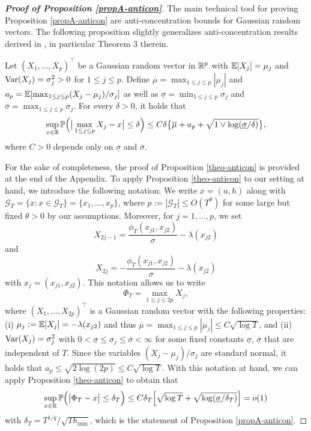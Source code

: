 \documentclass[a4paper,12pt]{article}
\numberwithin{equation}{section}
\begin{document}
\begin{proof}[\textnormal{\textbf{Proof of Proposition \ref{propA-anticon}}}] 
The main technical tool for proving Proposition \ref{propA-anticon} are anti-concentration bounds for Gaussian random vectors. The following proposition slightly generalizes anti-concentration results derived in \cite{Chernozhukov2015}, in particular Theorem 3 therein. 
\begin{propA}\label{theo-anticon}
Let $(X_1,\ldots,X_p)^\top$ be a Gaussian random vector in $\mathbb{R}^p$ with $\mathbb{E}[X_j] = \mu_j$ and $\textnormal{Var}(X_j) = \sigma_j^2 > 0$ for $1 \le j \le p$. Define $\overline{\mu} = \max_{1 \le j \le p} |\mu_j|$ and $a_p = \mathbb{E}[ \max_{1 \le j \le p} (X_j-\mu_j)/\sigma_j ]$ as well as $\underline{\sigma} = \min_{1 \le j \le p} \sigma_j$ and $\overline{\sigma} = \max_{1 \le j \le p} \sigma_j$. For every $\delta > 0$, it holds that
\[ \sup_{x \in \mathbb{R}} \mathbb{P} \Big( \big| \max_{1 \le j \le p} X_j - x \big| \le \delta \Big) \le C \delta \big\{ \overline{\mu} + a_p + \sqrt{1 \vee \log(\underline{\sigma}/\delta)} \big\}, \]
where $C > 0$ depends only on $\underline{\sigma}$ and $\overline{\sigma}$. 
\end{propA} 
For the sake of completeness, the proof of Proposition \ref{theo-anticon} is provided at the end of the Appendix. To apply Proposition \ref{theo-anticon} to our setting at hand, we introduce the following notation: We write $x = (u,h)$ along with $\mathcal{G}_T = \{ x : x \in \mathcal{G}_T \} = \{x_1,\ldots,x_p\}$, where $p := |\mathcal{G}_T| \le O(T^\theta)$ for some large but fixed $\theta > 0$ by our assumptions. Moreover, for $j = 1,\ldots,p$, we set 
\[ X_{2j-1} = \frac{\phi_T(x_{j1},x_{j2})}{\sigma} - \lambda(x_{j2}) \]
and 
\[ X_{2j} = -\frac{\phi_T(x_{j1},x_{j2})}{\sigma} - \lambda(x_{j2}) \]
with $x_j = (x_{j1},x_{j2})$. This notation allows us to write
\[ \Phi_T = \max_{1 \le j \le 2p} X_j, \]
where $(X_1,\ldots,X_{2p})^\top$ is a Gaussian random vector with the following properties: (i) $\mu_j := \mathbb{E}[X_j] = - \lambda(x_{j2})$ and thus $\overline{\mu} = \max_{1 \le j \le p} |\mu_j| \le C \sqrt{\log T}$, and (ii) $\textnormal{Var}(X_j) = \sigma_j^2$ with $0 < \underline{\sigma} \le \sigma_j \le \overline{\sigma} < \infty$ for some fixed constants $\underline{\sigma}$, $\overline{\sigma}$ that are independent of $T$. Since the variables $(X_j - \mu_j)/\sigma_j$ are standard normal, it holds that $a_p \le \sqrt{2 \log (2p)} \le C \sqrt{\log T}$. With this notation at hand, we can apply Proposition \ref{theo-anticon} to obtain that 
\[ \sup_{x \in \mathbb{R}} \mathbb{P} \Big( \big| \Phi_T - x \big| \le \delta_T \Big) \le C \delta_T \Big[ \sqrt{\log T} + \sqrt{ \log(\underline{\sigma}/\delta_T) } \Big] = o(1) \]
with $\delta_T = T^{1/q} / \sqrt{T h_{\min}}$, which is the statement of Proposition \ref{propA-anticon}.
\end{proof}
\end{document}
